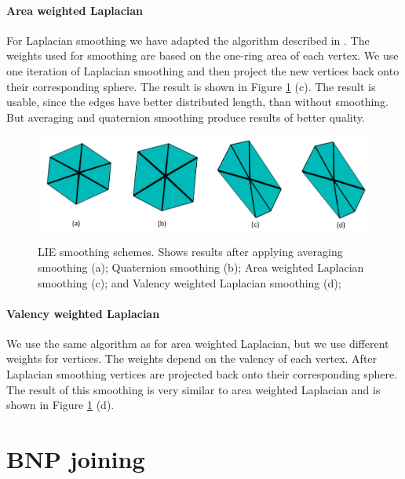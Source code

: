 \paragraph{Area weighted Laplacian}
For Laplacian smoothing we have adapted the algorithm described in \cite{laplac_phd}. The weights used for smoothing are based on the one-ring area of each vertex. We use one iteration of Laplacian smoothing and then project the new vertices back onto their corresponding sphere. The result is shown in Figure \ref{fig:smoothing_ilu} (c). The result is usable, since the edges have better distributed length, than without smoothing. But averaging and quaternion smoothing produce results of better quality.

\begin{figure}[h]
    \centering
    \includegraphics[width=\textwidth]{images/smoothing_ilu.png}
    \label{fig:smoothing_ilu}
    \caption[LIE smoothing schemes]{LIE smoothing schemes. Shows results after applying averaging smoothing (a); Quaternion smoothing (b); Area weighted Laplacian smoothing (c); and Valency weighted Laplacian smoothing (d);}
\end{figure}

\paragraph{Valency weighted Laplacian}
We use the same algorithm as for area weighted Laplacian, but we use different weights for vertices. The weights depend on the valency of each vertex. After Laplacian smoothing vertices are projected back onto their corresponding sphere. The result of this smoothing is very similar to area weighted Laplacian and is shown in Figure \ref{fig:smoothing_ilu} (d).

\section{BNP joining}
